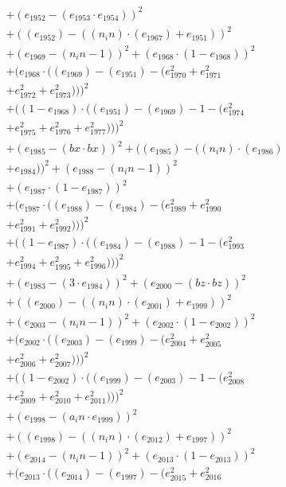 \documentclass[10pt, a4paper]{article}
\begin{document}
\begin{small}
\begin{align*}
& + (e_{1952} - (e_{1953}  \cdot  e_{1954}))^{2} \\
& + ((e_{1952}) - ((n_in)  \cdot  (e_{1967}) + e_{1951}))^{2} \\
& + (e_{1969} - (n_in - 1))^{2} + (e_{1968}  \cdot  (1 - e_{1968}))^{2} \\
& + (e_{1968}  \cdot  ((e_{1969}) - (e_{1951}) - (e_{1970}^{2} + e_{1971}^{2} \\
& + e_{1972}^{2} + e_{1973}^{2})))^{2} \\
& + ((1 - e_{1968})  \cdot  ((e_{1951}) - (e_{1969}) - 1 - (e_{1974}^{2} \\
& + e_{1975}^{2} + e_{1976}^{2} + e_{1977}^{2})))^{2} \\
& + (e_{1985} - (bx  \cdot  bx))^{2} + ((e_{1985}) - ((n_in)  \cdot  (e_{1986}) \\
& + e_{1984}))^{2} + (e_{1988} - (n_in - 1))^{2} \\
& + (e_{1987}  \cdot  (1 - e_{1987}))^{2} \\
& + (e_{1987}  \cdot  ((e_{1988}) - (e_{1984}) - (e_{1989}^{2} + e_{1990}^{2} \\
& + e_{1991}^{2} + e_{1992}^{2})))^{2} \\
& + ((1 - e_{1987})  \cdot  ((e_{1984}) - (e_{1988}) - 1 - (e_{1993}^{2} \\
& + e_{1994}^{2} + e_{1995}^{2} + e_{1996}^{2})))^{2} \\
& + (e_{1983} - (3  \cdot  e_{1984}))^{2} + (e_{2000} - (bz  \cdot  bz))^{2} \\
& + ((e_{2000}) - ((n_in)  \cdot  (e_{2001}) + e_{1999}))^{2} \\
& + (e_{2003} - (n_in - 1))^{2} + (e_{2002}  \cdot  (1 - e_{2002}))^{2} \\
& + (e_{2002}  \cdot  ((e_{2003}) - (e_{1999}) - (e_{2004}^{2} + e_{2005}^{2} \\
& + e_{2006}^{2} + e_{2007}^{2})))^{2} \\
& + ((1 - e_{2002})  \cdot  ((e_{1999}) - (e_{2003}) - 1 - (e_{2008}^{2} \\
& + e_{2009}^{2} + e_{2010}^{2} + e_{2011}^{2})))^{2} \\
& + (e_{1998} - (a_in  \cdot  e_{1999}))^{2} \\
& + ((e_{1998}) - ((n_in)  \cdot  (e_{2012}) + e_{1997}))^{2} \\
& + (e_{2014} - (n_in - 1))^{2} + (e_{2013}  \cdot  (1 - e_{2013}))^{2} \\
& + (e_{2013}  \cdot  ((e_{2014}) - (e_{1997}) - (e_{2015}^{2} + e_{2016}^{2} \\

\end{align*}
\end{small}
\end{document}
